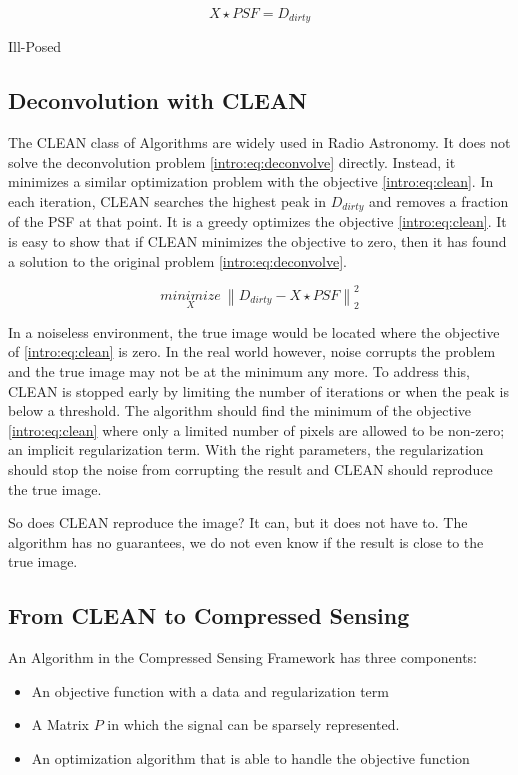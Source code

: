 \begin{equation}\label{intro:eq:deconvolve}
X \star  PSF = D_{dirty} 
\end{equation}

Ill-Posed

\subsection{Deconvolution with CLEAN}
The CLEAN class of Algorithms\cite{hogbom1974aperture}\cite{schwab1984relaxing}\cite{rich2008multi}\cite{rau2011multi} are widely used in Radio Astronomy. It does not solve the deconvolution problem \eqref{intro:eq:deconvolve} directly. Instead, it minimizes a similar optimization problem with the objective  \eqref{intro:eq:clean}. In each iteration, CLEAN searches the highest peak in $D_{dirty}$ and removes a fraction of the PSF at that point. It is a greedy optimizes the objective \eqref{intro:eq:clean}. It is easy to show that if CLEAN minimizes the objective to zero, then it has found a solution to the original problem \eqref{intro:eq:deconvolve}. 

\begin{equation}\label{intro:eq:clean}
\underset{X}{minimize} \: \left \| D_{dirty} - X \star PSF \right \|_2^2
\end{equation}

In a noiseless environment, the true image would be located where the objective of \eqref{intro:eq:clean} is zero. In the real world however, noise corrupts the problem and the true image may not be at the minimum any more. To address this, CLEAN is stopped early by limiting the number of iterations or when the peak is below a threshold. The algorithm should find the minimum of the objective \eqref{intro:eq:clean} where only a limited number of pixels are allowed to be non-zero; an implicit regularization term. With the right parameters, the regularization should stop the noise from corrupting the result and CLEAN should reproduce the true image.

So does CLEAN reproduce the image? It can, but it does not have to. The algorithm has no guarantees, we do not even know if the result is close to the true image. 


\subsection{From CLEAN to Compressed Sensing}
An Algorithm in the Compressed Sensing Framework has three components:
\begin{itemize}
	\item An objective function with a data and regularization term
	\item A Matrix $P$ in which the signal can be sparsely represented.
	\item An optimization algorithm that is able to handle the objective function
\end{itemize}

